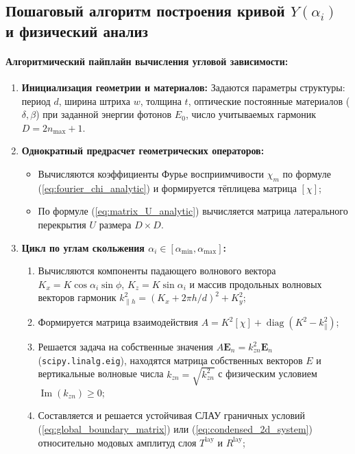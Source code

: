 \documentclass[a4paper,11pt]{article}
\begin{document}
\subsection{Пошаговый алгоритм построения кривой \texorpdfstring{$Y(\alpha_i)$}{Y(alpha_i)} и физический анализ}

\paragraph{Алгоритмический пайплайн вычисления угловой зависимости:}
\begin{enumerate}
    \item \textbf{Инициализация геометрии и материалов:}
    Задаются параметры структуры: период $d$, ширина штриха $w$, толщина $t$, оптические постоянные материалов ($\delta, \beta$) при заданной энергии фотонов $E_0$, число учитываемых гармоник $D = 2n_{\max} + 1$.
    \item \textbf{Однократный предрасчет геометрических операторов:}
    \begin{itemize}
        \item Вычисляются коэффициенты Фурье восприимчивости $\chi_m$ по формуле (\ref{eq:fourier_chi_analytic}) и формируется тёплицева матрица $[\chi]$;
        \item По формуле (\ref{eq:matrix_U_analytic}) вычисляется матрица латерального перекрытия $U$ размера $D \times D$.
    \end{itemize}
    \item \textbf{Цикл по углам скольжения $\alpha_i \in [\alpha_{\min}, \alpha_{\max}]$:}
    \begin{enumerate}
        \item Вычисляются компоненты падающего волнового вектора $K_x = K \cos\alpha_i \sin\phi$, $K_z = K \sin\alpha_i$ и массив продольных волновых векторов гармоник $k_{\parallel h}^2 = (K_x + 2\pi h / d)^2 + K_y^2$;
        \item Формируется матрица взаимодействия $A = K^2 [\chi] + \operatorname{diag}(K^2 - k_{\parallel}^2)$;
        \item Решается задача на собственные значения $A \mathbf{E}_n = k_{zn}^2 \mathbf{E}_n$ (\texttt{scipy.linalg.eig}), находятся матрица собственных векторов $E$ и вертикальные волновые числа $k_{zn} = \sqrt{k_{zn}^2}$ с физическим условием $\operatorname{Im}(k_{zn}) \ge 0$;
        \item Составляется и решается устойчивая СЛАУ граничных условий (\ref{eq:global_boundary_matrix}) или (\ref{eq:condensed_2d_system}) относительно модовых амплитуд слоя $T^{\text{lay}}$ и $R^{\text{lay}}$;

\end{enumerate}
\end{enumerate}
\end{document}
